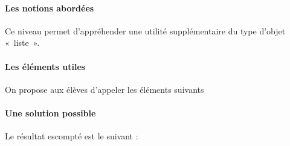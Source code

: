 \documentclass[letterpaper,10pt,french]{sphinxmanual}
\begin{document}
\paragraph{Les notions abordées}
\label{\detokenize{decouverte/pileface-python2:les-notions-abordees}}
Ce niveau permet d’appréhender une utilité supplémentaire du type d’objet « liste ».


\paragraph{Les éléments utiles}
\label{\detokenize{decouverte/pileface-python2:les-elements-utiles}}
On propose aux élèves d’appeler les éléments suivants

%
\begin{sphinxVerbatim}[commandchars=\\\{\}]
\PYG{p}{[}    \PYG{p}{]} 
\end{sphinxVerbatim}


\paragraph{Une solution possible}
\label{\detokenize{decouverte/pileface-python2:une-solution-possible}}
Le résultat escompté est le suivant :
\end{document}
